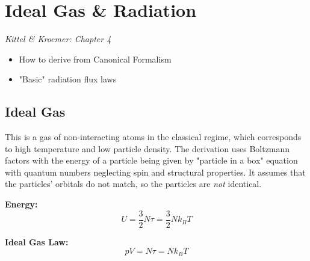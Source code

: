 \section{Ideal Gas \& Radiation}

\emph{Kittel \& Kroemer: Chapter 4}
\begin{itemize}
    \item How to derive from Canonical Formalism
    \item "Basic" radiation flux laws
\end{itemize}

\subsection{Ideal Gas}
This is a gas of non-interacting atoms in the classical regime, which corresponds to high temperature and low particle density. The derivation uses Boltzmann factors with the energy of a particle being given by "particle in a box" equation with quantum numbers neglecting spin and structural properties. It assumes that the particles' orbitals do not match, so the particles are \emph{not} identical.

\textbf{Energy:} 
\[
U=\frac{3}{2} N \tau = \frac{3}{2} N k_B T
\]

\textbf{Ideal Gas Law:} 
\[
pV = N\tau = N k_B T
\]

